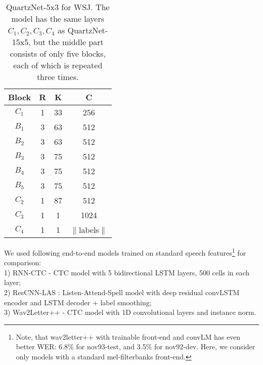 \documentclass{article}
\begin{document}
\begin{table}[thb]
\caption{QuartzNet-5x3 for WSJ. The model has the same layers $C_1, C_2, C_3, C_4$ as QuartzNet-15x5, but the middle part consists of only five blocks, each of which is repeated three times.}
\vspace{4pt}
\label{tab:WSJ_Architecture}
\centering
\scalebox{1.0}
{
\begin{tabular}{c c c c } 
 \hline
   \textbf{Block} & \textbf{R} & \textbf{K} & \textbf{C} \\
 \hline
 $C_1$ & 1 & 33 & 256 \\
 \hline
 $B_1$ & 3 & 63 & 512 \\
 $B_2$ & 3 & 63 & 512 \\
 $B_3$ & 3 & 75 & 512 \\
 $B_4$ & 3 & 75 & 512 \\
 $B_5$ & 3 & 75 & 512 \\
 \hline
 $C_2$ & 1 & 87 & 512 \\
 $C_3$ & 1 & 1 & 1024 \\
 $C_4$ & 1 & 1 & $\|$labels$\| $  \\
 \hline
\end{tabular}
}
\end{table}

We used following end-to-end models trained on standard speech features\footnote{Note, that wav2letter++ \cite{zeghidour2018b} with trainable front-end and convLM has even better WER: 6.8$\%$ for nov93-test, and 3.5$\%$ for nov92-dev. Here, we consider only models with a standard mel-filterbanks front-end.}
for comparison:\\
1) RNN-CTC \cite{Graves2014} -  CTC model with 5 bidirectional LSTM layers, 500 cells in each layer;\\
2) ResCNN-LAS \cite{Chorowski2016}: Listen-Attend-Spell model with deep residual convLSTM encoder and LSTM decoder + label smoothing;\\
3) Wav2Letter++ \cite{zeghidour2018b} - CTC model with 1D convolutional layers and instance norm.


\begin{table}[thb]
\centering
\caption{QuartzNet-5x3, WSJ, WER(\%)}
\vspace{4pt}
\label{tab:WSJ}
\end{table}
\end{document}
